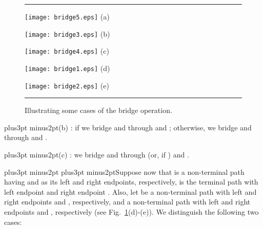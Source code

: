 \documentclass[10pt]{article}
\def\yskip{\penalty-50\vskip3pt plus3pt minus2pt}
\def\y{\yskip}
\def\yy{\yskip\yskip}
\begin{document}
\normalsize{
\bigskip

\begin{figure}[t]
\hrule \bigskip \hspace*{0.3in}
   \begin{minipage}[l]{2in}
    \texttt{[image: bridge5.eps]}
    \hspace*{1in}\small{(a)}
  \end{minipage}
  \begin{minipage}[r]{2in}
   \hspace*{1.1in}
    \texttt{[image: bridge3.eps]}
   \hspace*{2.2in}\small{(b)}
  \end{minipage}
\vspace{0.2in}

\hspace*{0.25in}
  \begin{minipage}[c]{2in}
    \hspace*{0.05in}
    \texttt{[image: bridge4.eps]}
   \hspace*{1.05in}\small{(c)}
  \end{minipage}
 \begin{minipage}[c]{2in}
    \hspace*{0.9in}
    \texttt{[image: bridge1.eps]}
   \hspace*{2.25in}\small{(d)}
  \end{minipage}
\vspace{0.2in}
 \vspace*{-0.2in}

\hspace*{0.25in}
 \begin{minipage}[c]{2in}
    \hspace*{1.5in}
    \texttt{[image: bridge2.eps]}
   \hspace*{2.9in}\small{(e)}
  \end{minipage}

    \caption{\small{Illustrating some cases of the bridge operation.}}
\bigskip \hrule
 \label{bridgeOP}
\end{figure}


\y\noindent (b) : if  we bridge  and  through  and ;
otherwise, we \phantom{(b)} bridge  and  through 
and .

\y \noindent (c) : we bridge  and
 through  (or,  if ) and .


\yy Suppose now that  is a non-terminal path having  and
 as its left and right endpoints, respectively,  is the
terminal path with left endpoint  and right endpoint
. Also, let  be a non-terminal path with left and
right endpoints  and , respectively, and  a
non-terminal path with left and right endpoints  and ,
respectively (see Fig.~\ref{bridgeOP}(d)-(e)). We distinguish the
following two cases:

}
\end{document}
